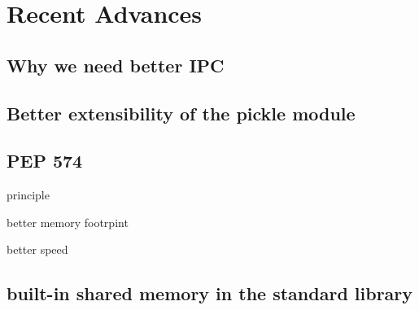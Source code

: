 \documentclass[14pt, usenames,dvipsnames]{beamer} %
\begin{document}
\section{Recent Advances}
\subsection{Why we need better IPC}
\subsection{Better extensibility of the pickle module}
\subsection{PEP 574}
    \begin{frame}[t]{principle}
    \end{frame}

    \begin{frame}[t]{better memory footrpint}
    \end{frame}

    \begin{frame}[t]{better speed}
    \end{frame}
\subsection{built-in shared memory in the standard library}



\begin{frame}[fragile]{}
    \begin{beamerboxesrounded}{}
        \inputminted[fontfamily=fvm, bgcolor=beige]{python}{scripts/test_script.py}
    \end{beamerboxesrounded}
\end{frame}
\end{document}
